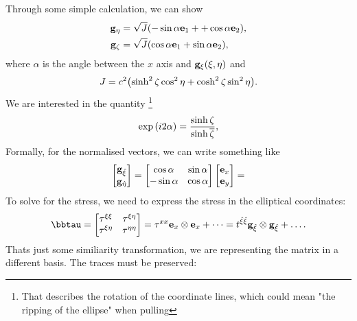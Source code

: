 \documentclass[../main.tex]{subfiles}
\begin{document}
Through some simple calculation, we can show
\begin{align*}
	\vb{g}_{\eta} &= \sqrt{J}\qty(-\sin \alpha \vb{e}_1+ + \cos \alpha\vb{e}_2), \\
	\vb{g}_{\zeta} &= \sqrt{J}\qty(\cos \alpha \vb{e}_1 + \sin \alpha \vb{e}_2),
\end{align*}
where $\alpha$ is the angle between the $x$ axis and $\vb{g}_{\xi}\qty(\xi,\eta)$ and
\[
	J = c^{2}\qty(\sinh^{2}\zeta \cos^{2}\eta + \cosh^{2}\zeta \sin^{2}\eta).
\]
We are interested in the quantity \footnote{That describes the rotation of the coordinate lines, which could mean "the ripping of the ellipse" when pulling}
\[
	\exp\qty(i 2 \alpha) = \frac{\sinh \zeta}{\sinh \overline{\zeta}},
\]
Formally, for the normalised vectors, we can write something like
\[
	\begin{bmatrix}
		\vb{g}_{\hat{\xi}} \\ \vb{g}_{\hat{\eta}} 
	\end{bmatrix}
	= \begin{bmatrix}
		\cos \alpha & \sin \alpha \\
		- \sin \alpha & \cos \alpha 
	\end{bmatrix}
	\begin{bmatrix}
		\vb{e}_x \\
		\vb{e}_y
	\end{bmatrix} =
\]
To solve for the stress, we need to express the stress in the elliptical coordinates: 
\begin{equation*}
  \bbtau = \begin{bmatrix}
	  \tau^{\xi \xi} & \tau^{\xi \eta} \\
	  \tau^{\xi \eta} & \tau^{\eta \eta}
  \end{bmatrix} = \tau^{xx}\vb{e}_x \otimes \vb{e}_x + \dots = t^{\hat{\xi}\hat{\xi}}\vb{g}_{\hat{\xi}}\otimes \vb{g}_{\hat{\xi}} + \dots.
\end{equation*}
Thats just some similiarity transformation, we are representing the matrix in a different basis. The traces must be preserved:
\end{document}
